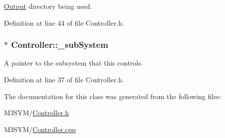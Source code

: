 \hyperlink{classOutput}{Output} directory being used. 



Definition at line 44 of file Controller.\+h.

\hypertarget{classController_a7798357b742dc62782fd7dd26b23528e}{
\subsubsection[{\+\_\+sub\+System}]{$\ast$ Controller\+::\+\_\+sub\+System\hspace{0.3cm}{\ttfamily [private]}}}\label{classController_a7798357b742dc62782fd7dd26b23528e}


A pointer to the subsystem that this controls. 



Definition at line 37 of file Controller.\+h.



The documentation for this class was generated from the following files\+:\begin{DoxyCompactItemize}
\item 
M3\+S\+Y\+M/\hyperlink{Controller_8h}{Controller.\+h}\item 
M3\+S\+Y\+M/\hyperlink{Controller_8cpp}{Controller.\+cpp}\end{DoxyCompactItemize}
